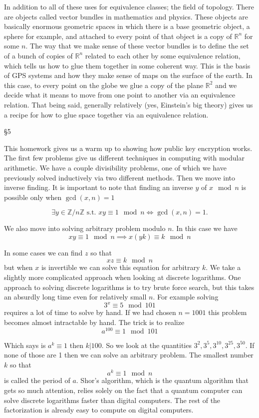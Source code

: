 \documentclass[16 pt]{amsart}
\theoremstyle{definition}
\theoremstyle{remark}
\numberwithin{equation}{subsection}
\newcommand{\R}{\mathbb{R}}
\newcommand{\Z}{\mathbb{Z}}
\begin{document}
\par In addition to all of these uses for equivalence classes; the field of topology.  There are objects called vector bundles in mathematics and physics.  These objects are basically enormous geometric spaces in which there is a base geometric object, a sphere for example, and attached to every point of that object is a copy of $\R^n$ for some $n$.  The way that we make sense of these vector bundles is to define the set of a bunch of copies of $\R^n$ related to each other by some equivalence relation, which tells us how to glue them together in some coherent way.  This is the basis of GPS systems and how they make sense of maps on the surface of the earth.  In this case, to every point on the globe we glue a copy of the plane $\R^2$ and we decide what it means to move from one point to another via an equivalence relation.  That being said, generally relatively (yes, Einstein's big theory) gives us a recipe for how to glue space together via an equivalence relation. 

\S5

This homework gives us a warm up to showing how public key encryption works.  The first few problems give us different techniques in computing with modular arithmetic.  We have a couple divisibility problems, one of which we have previously solved inductively via two different methods.  Then we move into inverse finding.  It is important to  note that finding an inverse $y$ of $x\mod{n}$ is possible only when $\gcd(x,n)=1$

\[
\exists y\in \Z/n\Z \text{ s.t. } xy\equiv 1\mod{n} \iff \gcd(x,n)=1.
\]

We also move into solving arbitrary problem modulo $n$.  In this case we have
\[
xy\equiv 1\mod{n} \implies x(yk) \equiv k \mod{n}
\]

In some cases we can find $z$ so that
\[
xz\equiv k \mod{n}
\]
but when $x$ is invertible we can solve this equation for arbitrary $k$.  We take a slightly more complicated approach when looking at discrete logarithms.  One approach to solving discrete logarithms is to try brute force search, but this takes an absurdly long time even for relatively small $n$.  For example solving 
\[
3^x \equiv 5 \mod{101}
\]
requires a lot of time to solve by hand.  If we had chosen $n=1001$ this problem becomes almost intractable by hand.  The trick is to realize
\[
a^{100}\equiv 1\mod{101}
\]

Which says is $a^k\equiv1$ then $k|100$. So we look at the quantities $3^2,3^5,3^{10},3^{25},3^{50}$.  If none of those are 1 then we can solve an arbitrary problem.  The smallest number $k$ so that
\[
a^k \equiv 1 \mod{n}
\]
is called the period of $a$.  Shor's algorithm, which is the quantum algorithm that gets so much attention, relies solely on the fact that a quantum computer can solve discrete logarithms faster than digital computers.  The rest of the factorization is already easy to compute on digital computers.
\end{document}
